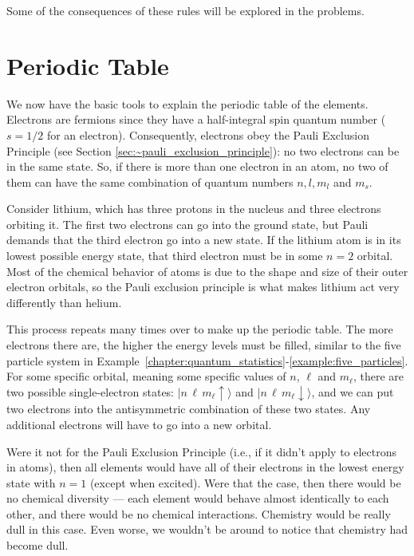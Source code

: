 Some of the consequences of these rules will be explored in the
problems.

\section{Periodic Table}
\label{sec:periodic_table}

We now have the basic tools to explain the periodic table of the 
elements. Electrons are fermions since they have a half-integral
spin quantum number ($s = 1/2$ for an electron). Consequently,
electrons obey the Pauli Exclusion Principle (see Section
\ref{sec:~pauli_exclusion_principle}): no two electrons can be in the same
state. So, if there is more than one electron in an atom, no
two of them can have the same combination of quantum numbers
$n, l, m_l$ and $m_s$.

Consider lithium, which has three protons in the nucleus
and three electrons orbiting it.  The first two electrons can go into
the ground state, but Pauli demands that the third electron go into a
new state.  If the lithium atom is in its lowest possible energy
state, that third electron must be in some $n=2$ orbital.  Most of the
chemical behavior of atoms is due to the shape and size of their outer
electron orbitals, so the Pauli exclusion principle is what makes
lithium act very differently than helium.

This process repeats many times over to make up the periodic table.
The more electrons there are, the higher the energy levels must be filled,
similar to the five particle system in Example~\ref{chapter:quantum_statistics}-\ref{example:five_particles}.
For some specific orbital, meaning some specific values of $n$, $\ell$
and $m_\ell$, there are two possible single-electron states:
$|n\,\ell\,m_\ell\uparrow\rangle$ and
$|n\,\ell\,m_\ell\downarrow\rangle$, and we can put two electrons into
the antisymmetric combination of these two states.  Any additional
electrons will have to go into a new orbital.

Were it not for the Pauli Exclusion Principle (i.e., if it didn't apply
to electrons in atoms), then all elements would have all of their
electrons in the lowest energy state with $n = 1$ (except when
excited). Were that the case, then there would be no chemical diversity ---
each element would behave almost identically to each other, and
there would be no chemical interactions. Chemistry would be really dull
in this case. Even worse, we wouldn't be around to notice that chemistry
had become dull.


